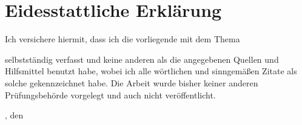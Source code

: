 \chapter*{Eidesstattliche Erklärung} %

Ich versichere hiermit, dass ich die vorliegende {\subjectDocument} mit dem Thema
\begin{quote}
	\textit{\titleDocument}
\end{quote}
selbstständig verfasst und keine anderen als die angegebenen Quellen und Hilfsmittel benutzt habe, wobei ich alle wörtlichen und sinngemäßen Zitate als solche gekennzeichnet habe.
Die Arbeit wurde bisher keiner anderen Prüfungsbehörde vorgelegt und auch nicht veröffentlicht.

\vspace*{2cm}

\begingroup
	\setlength{\parindent}{0pt} %
	
	\locationDocument, den \dateDocument
	\bigskip
	\bigskip
	
	\newlength{\widthbox}
	\settowidth{\widthbox}{\locationDocument, den \dateDocument}
	
	\makebox[\widthbox]{\hrulefill}\\
	\authorDocument
\endgroup
